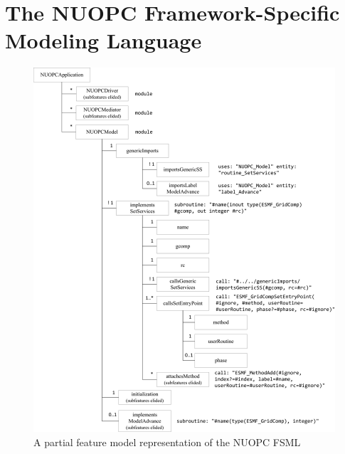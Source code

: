 \documentclass[oneside,11pt]{memoir}
\begin{document}
\section{The NUOPC Framework-Specific Modeling Language}



\begin{figure}
	\centering
	 \includegraphics[width=\textwidth]{figs/nuopcfm.png}
	\caption{A partial feature model representation of the NUOPC FSML}
	\label{fig:nuopcfm}
\end{figure}
\end{document}
